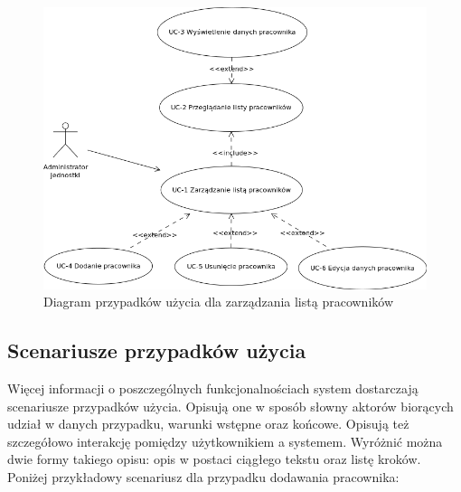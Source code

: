 \begin{figure}[tdh]
    \begin{center}
	\includegraphics[scale=.6]{img/diagram-uc.png}
	\caption{Diagram przypadków użycia dla zarządzania listą pracowników}
	\label{diagram-uc}
    \end{center}
\end{figure}


\subsection[Scenariusze przypadków użycia][Scenariusze przypadków użycia]{Scenariusze przypadków użycia}
Więcej informacji o poszczególnych funkcjonalnościach system dostarczają scenariusze przypadków użycia. Opisują one w sposób słowny aktorów biorących udział w danych przypadku, warunki wstępne oraz końcowe. Opisują też szczegółowo interakcję pomiędzy użytkownikiem a systemem. Wyróżnić można dwie formy takiego opisu: opis w postaci ciągłego tekstu oraz listę kroków. Poniżej przykładowy scenariusz dla przypadku dodawania pracownika:

